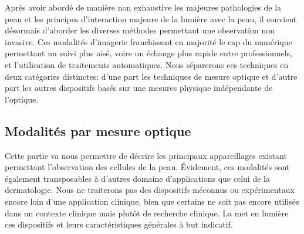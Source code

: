 Après avoir abordé de manière non exhaustive les majeures pathologies de la peau et les principes d'interaction majeure de la lumière avec la peau, il convient désormais d'aborder les diverses méthodes permettant une observation non invasive. Ces modalités d'imagerie franchissent en majorité le cap du numérique permettant un suivi plus aisé, voire un échange plus rapide entre professionnels, et l’utilisation de traitements automatiques. Nous séparerons ces techniques en deux catégories distinctes: d’une part les techniques de mesure optique et d'autre part les autres dispositifs basés sur une mesures physique indépendante de l'optique.\par

\subsection{Modalités par mesure optique}
Cette partie va nous permettre de décrire les principaux appareillages existant permettant l'observation des cellules de la peau. Évidement, ces modalités sont également transposables à d'autres domaine d'applications que celui de la dermatologie. Nous ne traiterons pas des dispositifs méconnus ou expérimentaux encore loin d'une application clinique, bien que certains ne soit pas encore utilisés dans un contexte clinique mais plutôt de recherche clinique. La  met en lumière ces dispositifs et leurs caractéristiques générales à but indicatif.\par
